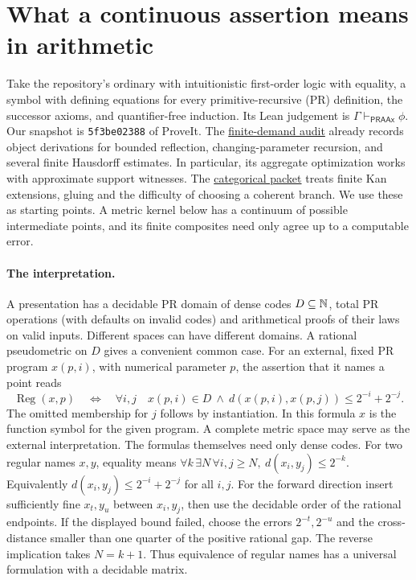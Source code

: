 \section{What a continuous assertion means in arithmetic}
\label{sec:framework}

Take the repository's ordinary \ipra{} with intuitionistic first-order logic with equality, a symbol with defining equations for every primitive-recursive (PR) definition, the successor axioms, and quantifier-free induction. Its Lean judgement is \( \Gamma\vdash_{\mathsf{PRAAx}}\phi \). Our snapshot is \texttt{5f3be02388} of ProveIt. The \href{https://github.com/VladimirReshetnikov/ProveIt/blob/5f3be02388442f16487d2dc5c2529961dd783d2b/Logic/PrimitiveRecursiveArithmetic/Derivations/FINITE-DEMAND-CLAIMS.md}{finite-demand audit} already records object derivations for bounded reflection, changing-parameter recursion, and several finite Hausdorff estimates. In particular, its aggregate optimization works with approximate support witnesses. The \href{https://github.com/VladimirReshetnikov/ProveIt/tree/5f3be02388442f16487d2dc5c2529961dd783d2b/Logic/PrimitiveRecursiveArithmetic/docs/proofs/foundations/ipra_categorical_methods}{categorical packet} treats finite Kan extensions, gluing and the difficulty of choosing a coherent branch. We use these as starting points. A metric kernel below has a continuum of possible intermediate points, and its finite composites need only agree up to a computable error.

\paragraph{The interpretation.}
A presentation has a decidable PR domain of dense codes \(D\subseteq\mathbb N\), total PR operations (with defaults on invalid codes) and arithmetical proofs of their laws on valid inputs. Different spaces can have different domains. A rational pseudometric on \(D\) gives a convenient common case. For an external, fixed PR program \(x(p,i)\), with numerical parameter \(p\), the assertion that it names a point reads
\[
 \operatorname{Reg}(x,p)\quad\Longleftrightarrow\quad
 \forall i,j\quad x(p,i)\in D\ \land\
 d(x(p,i),x(p,j))\le 2^{-i}+2^{-j}.
\]
The omitted membership for \(j\) follows by instantiation. In this formula \(x\) is the function symbol for the given program. A complete metric space may serve as the external interpretation. The formulas themselves need only dense codes. For two regular names \(x,y\), equality means
\(\forall k\,\exists N\,\forall i,j\ge N,\ d(x_i,y_j)\le 2^{-k}\).
Equivalently \(d(x_i,y_j)\le 2^{-i}+2^{-j}\) for all \(i,j\). For the forward direction insert sufficiently fine \(x_t,y_u\) between \(x_i,y_j\), then use the decidable order of the rational endpoints. If the displayed bound failed, choose the errors \(2^{-t},2^{-u}\) and the cross-distance smaller than one quarter of the positive rational gap. The reverse implication takes \(N=k+1\). Thus equivalence of regular names has a universal formulation with a decidable matrix.

